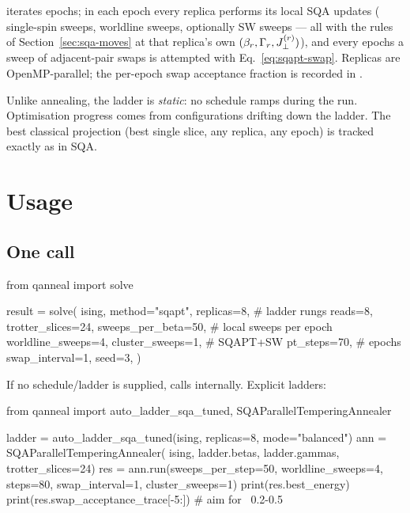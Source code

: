  iterates  epochs; in
each epoch every replica performs its local SQA updates
( single-spin sweeps, 
worldline sweeps, optionally  SW sweeps --- all with
the rules of Section~\ref{sec:sqa-moves} at that replica's own
$(\beta_r,\Gamma_r,J_{\perp}^{(r)})$), and every  epochs a
sweep of adjacent-pair swaps is attempted with
Eq.~\eqref{eq:sqapt-swap}. Replicas are OpenMP-parallel; the per-epoch swap
acceptance fraction is recorded in .

Unlike annealing, the ladder is \emph{static}: no schedule ramps during the
run. Optimisation progress comes from configurations drifting down the
ladder. The best classical projection (best single slice, any replica, any
epoch) is tracked exactly as in SQA.

\section{Usage}

\subsection{One call}

\begin{pycode}
from qanneal import solve

result = solve(
    ising,
    method="sqapt",
    replicas=8,          # ladder rungs
    reads=8,
    trotter_slices=24,
    sweeps_per_beta=50,  # local sweeps per epoch
    worldline_sweeps=4,
    cluster_sweeps=1,    # SQAPT+SW
    pt_steps=70,         # epochs
    swap_interval=1,
    seed=3,
)
\end{pycode}

If no schedule/ladder is supplied,  calls
 internally. Explicit ladders:

\begin{pycode}
from qanneal import auto_ladder_sqa_tuned, SQAParallelTemperingAnnealer

ladder = auto_ladder_sqa_tuned(ising, replicas=8, mode="balanced")
ann = SQAParallelTemperingAnnealer(
    ising, ladder.betas, ladder.gammas, trotter_slices=24)
res = ann.run(sweeps_per_step=50, worldline_sweeps=4,
              steps=80, swap_interval=1, cluster_sweeps=1)
print(res.best_energy)
print(res.swap_acceptance_trace[-5:])   # aim for ~0.2-0.5
\end{pycode}

